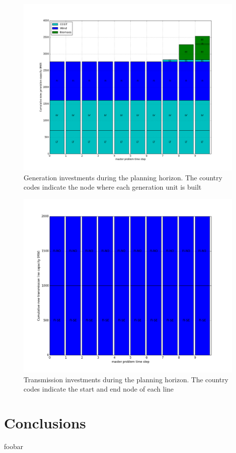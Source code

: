 \documentclass[final]{IEEEtran}
\begin{document}
\begin{figure}[htpb]
	\centering
	\includegraphics[width=\linewidth]{generation_investment_milp_dc_miqp_dc.png}
	\caption{Generation investments during the planning horizon. The country codes indicate the node where each generation unit is built}
	\label{fig_generation_investment}
\end{figure}

\begin{figure}[htpb]
	\centering
	\includegraphics[width=\linewidth]{transmission_investment_milp_dc_miqp_dc.png}
	\caption{Transmission investments during the planning horizon. The country codes indicate the start and end node of each line}
	\label{fig_transmission_investment}
\end{figure}

\section{Conclusions}
\label{section_conclusions}

foobar



\end{document}
